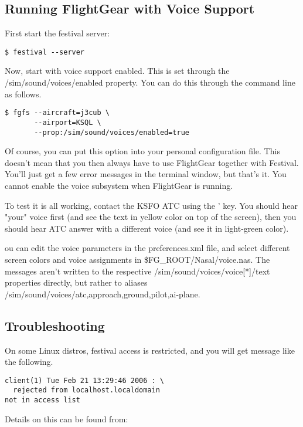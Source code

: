 \subsection{Running FlightGear with Voice Support}

First start the festival server:

\begin{verbatim}
$ festival --server
\end{verbatim}

Now, start \FlightGear{} with voice support enabled. This is set through the
/sim/sound/voices/enabled property. You can do this through the command line as follows.

\begin{verbatim}
$ fgfs --aircraft=j3cub \
       --airport=KSQL \
       --prop:/sim/sound/voices/enabled=true
\end{verbatim}

Of course, you can put this option into your personal configuration file. 
This doesn't mean that you then always have to use FlightGear together with Festival. 
You'll just get a few error messages in the terminal window, but that's it. You cannot enable
the voice subsystem when FlightGear is running.

To test it is all working, contact the KSFO ATC using the ' key. You should hear "your" 
voice first (and see the text in yellow color on top of the screen), then you should hear 
ATC answer with a different voice (and see it in light-green color).

ou can edit the voice parameters in the preferences.xml file, and select different screen colors 
and voice assignments in \$FG\_ROOT/Nasal/voice.nas. The messages aren't written to the 
respective /sim/sound/voices/voice[*]/text properties directly, but rather to aliases 
/sim/sound/voices/{atc,approach,ground,pilot,ai-plane}.

\subsection{Troubleshooting}

On some Linux distros, festival access is restricted, and you will get message like the following. 

\begin{verbatim}
client(1) Tue Feb 21 13:29:46 2006 : \
  rejected from localhost.localdomain 
not in access list
\end{verbatim}

Details on this can be found from:

